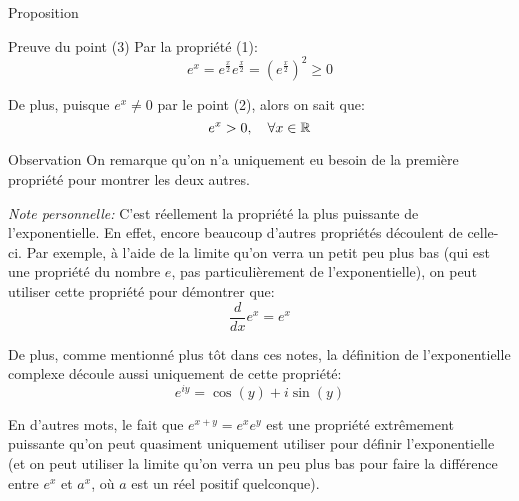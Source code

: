 \documentclass[a4paper]{article}
\begin{document}
\begin{parag}{Proposition}
    \begin{subparag}{Preuve du point (3)}
        Par la propriété (1):
        \[e^x = e^{\frac{x}{2}} e^{\frac{x}{2}} = \left(e^{\frac{x}{2}}\right)^2 \geq 0\]

        De plus, puisque $e^x \neq 0$ par le point (2), alors on sait que: 
        \[e^x > 0, \quad \forall x \in \mathbb{R}\]
    \end{subparag}

    \begin{subparag}{Observation}
        On remarque qu'on n'a uniquement eu besoin de la première propriété pour montrer les deux autres. 

        \textit{Note personnelle:} C'est réellement la propriété la plus puissante de l'exponentielle. En effet, encore beaucoup d'autres propriétés découlent de celle-ci. Par exemple, à l'aide de la limite qu'on verra un petit peu plus bas (qui est une propriété du nombre $e$, pas particulièrement de l'exponentielle), on peut utiliser cette propriété pour démontrer que:
        \[\frac{d}{dx} e^x = e^x\]

        De plus, comme mentionné plus tôt dans ces notes, la définition de l'exponentielle complexe découle aussi uniquement de cette propriété:
        \[e^{iy} = \cos\left(y\right) + i\sin\left(y\right)\]
         
        En d'autres mots, le fait que $e^{x + y} = e^x e^y$ est une propriété extrêmement puissante qu'on peut quasiment uniquement utiliser pour définir l'exponentielle (et on peut utiliser la limite qu'on verra un peu plus bas pour faire la différence entre $e^x$ et $a^x$, où $a$ est un réel positif quelconque).
    \end{subparag}
\end{parag}
\end{document}
